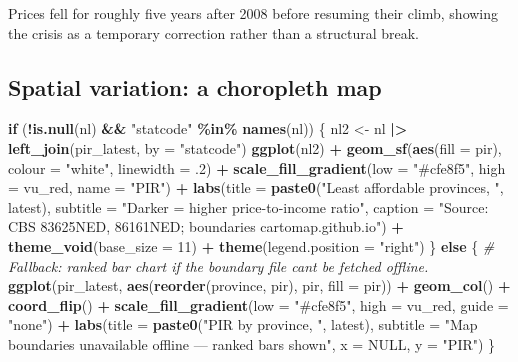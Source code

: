 \documentclass[
]{article}
\newenvironment{Shaded}{\begin{snugshade}}{\end{snugshade}}
\newcommand{\AttributeTok}[1]{\textcolor[rgb]{0.13,0.29,0.53}{#1}}
\newcommand{\CommentTok}[1]{\textcolor[rgb]{0.56,0.35,0.01}{\textit{#1}}}
\newcommand{\ConstantTok}[1]{\textcolor[rgb]{0.56,0.35,0.01}{#1}}
\newcommand{\ControlFlowTok}[1]{\textcolor[rgb]{0.13,0.29,0.53}{\textbf{#1}}}
\newcommand{\DecValTok}[1]{\textcolor[rgb]{0.00,0.00,0.81}{#1}}
\newcommand{\FunctionTok}[1]{\textcolor[rgb]{0.13,0.29,0.53}{\textbf{#1}}}
\newcommand{\NormalTok}[1]{#1}
\newcommand{\OtherTok}[1]{\textcolor[rgb]{0.56,0.35,0.01}{#1}}
\newcommand{\SpecialCharTok}[1]{\textcolor[rgb]{0.81,0.36,0.00}{\textbf{#1}}}
\newcommand{\StringTok}[1]{\textcolor[rgb]{0.31,0.60,0.02}{#1}}
\newcounter{none} %
\begin{document}
Prices fell for roughly five years after 2008 before resuming their
climb, showing the crisis as a temporary correction rather than a
structural break.

\subsection{Spatial variation: a choropleth
map}\label{spatial-variation-a-choropleth-map}

\begin{Shaded}
\begin{Highlighting}[]
\ControlFlowTok{if}\NormalTok{ (}\SpecialCharTok{!}\FunctionTok{is.null}\NormalTok{(nl) }\SpecialCharTok{\&\&} \StringTok{"statcode"} \SpecialCharTok{\%in\%} \FunctionTok{names}\NormalTok{(nl)) \{}
\NormalTok{  nl2 }\OtherTok{\textless{}{-}}\NormalTok{ nl }\SpecialCharTok{|\textgreater{}} \FunctionTok{left\_join}\NormalTok{(pir\_latest, }\AttributeTok{by =} \StringTok{"statcode"}\NormalTok{)}
  \FunctionTok{ggplot}\NormalTok{(nl2) }\SpecialCharTok{+}
    \FunctionTok{geom\_sf}\NormalTok{(}\FunctionTok{aes}\NormalTok{(}\AttributeTok{fill =}\NormalTok{ pir), }\AttributeTok{colour =} \StringTok{"white"}\NormalTok{, }\AttributeTok{linewidth =}\NormalTok{ .}\DecValTok{2}\NormalTok{) }\SpecialCharTok{+}
    \FunctionTok{scale\_fill\_gradient}\NormalTok{(}\AttributeTok{low =} \StringTok{"\#cfe8f5"}\NormalTok{, }\AttributeTok{high =}\NormalTok{ vu\_red, }\AttributeTok{name =} \StringTok{"PIR"}\NormalTok{) }\SpecialCharTok{+}
    \FunctionTok{labs}\NormalTok{(}\AttributeTok{title =} \FunctionTok{paste0}\NormalTok{(}\StringTok{"Least affordable provinces, "}\NormalTok{, latest),}
         \AttributeTok{subtitle =} \StringTok{"Darker = higher price{-}to{-}income ratio"}\NormalTok{,}
         \AttributeTok{caption =} \StringTok{"Source: CBS 83625NED, 86161NED; boundaries cartomap.github.io"}\NormalTok{) }\SpecialCharTok{+}
    \FunctionTok{theme\_void}\NormalTok{(}\AttributeTok{base\_size =} \DecValTok{11}\NormalTok{) }\SpecialCharTok{+} \FunctionTok{theme}\NormalTok{(}\AttributeTok{legend.position =} \StringTok{"right"}\NormalTok{)}
\NormalTok{\} }\ControlFlowTok{else}\NormalTok{ \{}
  \CommentTok{\# Fallback: ranked bar chart if the boundary file can\textquotesingle{}t be fetched offline.}
  \FunctionTok{ggplot}\NormalTok{(pir\_latest, }\FunctionTok{aes}\NormalTok{(}\FunctionTok{reorder}\NormalTok{(province, pir), pir, }\AttributeTok{fill =}\NormalTok{ pir)) }\SpecialCharTok{+}
    \FunctionTok{geom\_col}\NormalTok{() }\SpecialCharTok{+} \FunctionTok{coord\_flip}\NormalTok{() }\SpecialCharTok{+}
    \FunctionTok{scale\_fill\_gradient}\NormalTok{(}\AttributeTok{low =} \StringTok{"\#cfe8f5"}\NormalTok{, }\AttributeTok{high =}\NormalTok{ vu\_red, }\AttributeTok{guide =} \StringTok{"none"}\NormalTok{) }\SpecialCharTok{+}
    \FunctionTok{labs}\NormalTok{(}\AttributeTok{title =} \FunctionTok{paste0}\NormalTok{(}\StringTok{"PIR by province, "}\NormalTok{, latest),}
         \AttributeTok{subtitle =} \StringTok{"Map boundaries unavailable offline — ranked bars shown"}\NormalTok{,}
         \AttributeTok{x =} \ConstantTok{NULL}\NormalTok{, }\AttributeTok{y =} \StringTok{"PIR"}\NormalTok{)}
\NormalTok{\}}
\end{Highlighting}
\end{Shaded}
\end{document}
